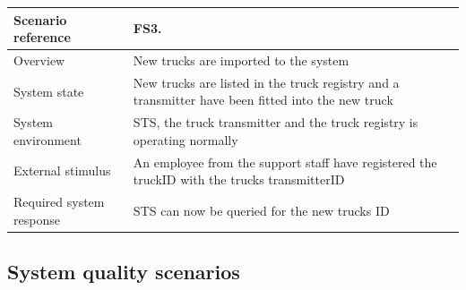 \documentclass[a4paper,11pt]{report}
\begin{document}
\begin{center}
  \begin{tabular}[h!]{| >{\columncolor{gray}}p{} | p{} |}
    \hline
    Scenario reference & FS3. \\
    \hline
    Overview & New trucks are imported to the system \\
    \hline
    System state & New trucks are listed in the truck registry and a transmitter have been fitted into the new truck\\
    \hline
    System environment & STS, the truck transmitter and the truck registry is operating normally\\
    \hline
    External stimulus & An employee from the support staff have registered the truckID with the trucks transmitterID \\
    \hline
    Required system response & STS can now be queried for the new trucks ID \\
    \hline
  \end{tabular}
\end{center}

\subsection{System quality scenarios}
\label{sec:syst-qual-scen}
\end{document}

